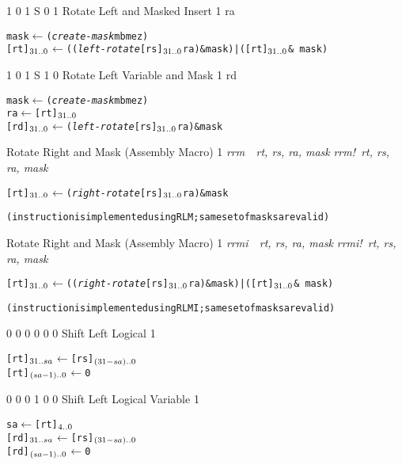  {1 0 1 S 0 1} { Rotate Left and Masked Insert }  {1} {\RawTag} {ra}
\begin{alltt}
        mask    \(\leftarrow\) ({\em{create-mask}} mb me z)
        [rt]\(\sb{31..0}\) \(\leftarrow\) (({\em{left-rotate}} [rs]\(\sb{31..0}\) ra) & mask) | ([rt]\(\sb{31..0}\) & ~mask)
\end{alltt}\rawInstrEnd

 {1 0 1 S 1 0} { Rotate Left Variable and Mask }  {1} {\RawTag} {rd}
\begin{alltt}
        mask    \(\leftarrow\) ({\em{create-mask}} mb me z)
        ra      \(\leftarrow\) [rt]\(\sb{31..0}\)
        [rd]\(\sb{31..0}\) \(\leftarrow\) ({\em{left-rotate}} [rs]\(\sb{31..0}\) ra) & mask
\end{alltt}\rawInstrEnd

       { Rotate Right and Mask (Assembly Macro) } {1} {\RawTag} {{\em rrm~~rt, rs, ra, mask}} {{\em rrm!~rt, rs, ra, mask}}
\begin{alltt}
        [rt]\(\sb{31..0}\) \(\leftarrow\) ({\em{right-rotate}} [rs]\(\sb{31..0}\) ra) & mask

        {\textsf{(instruction is implemented using RLM; same set of masks are valid)}}
\end{alltt}\rawInstrEnd

       { Rotate Right and Mask (Assembly Macro) } {1} {\RawTag} {{\em rrmi~~rt, rs, ra, mask}} {{\em rrmi!~rt, rs, ra, mask}}
\begin{alltt}
        [rt]\(\sb{31..0}\) \(\leftarrow\) (({\em{right-rotate}} [rs]\(\sb{31..0}\) ra) & mask) | ([rt]\(\sb{31..0}\) & ~mask)

        {\textsf{(instruction is implemented using RLMI; same set of masks are valid)}}
\end{alltt}\rawInstrEnd

    {0 0 0 0 0 0}    {Shift Left Logical}              {1}    {\MIPSTag}
\begin{alltt}
        [rt]\({\sb{31..sa}}\) \hspace{.75mm}  \(\leftarrow\) [rs]\({\sb{(31-sa)..0}}\)
        [rt]\({\sb{(sa-1)..0}}\) \(\leftarrow\) 0
\end{alltt}\rawInstrEnd

    {0 0 0 1 0 0}   {Shift Left Logical Variable}     {1}    {\MIPSTag}
\begin{alltt}
        sa      \hspace{1mm}   \(\leftarrow\) [rt]\(\sb{4..0}\)
        [rd]\({\sb{31..sa}}\) \hspace{.75mm}  \(\leftarrow\) [rs]\({\sb{(31-sa)..0}}\)
        [rd]\({\sb{(sa-1)..0}}\) \(\leftarrow\) 0
\end{alltt}\rawInstrEnd

